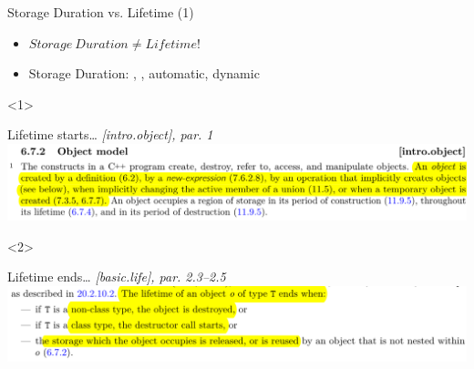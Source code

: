 \begin{frame}{Storage Duration vs. Lifetime (1)}
  \begin{itemize}
    \itemsep=1em
  \item $Storage~Duration \neq Lifetime$!

  \item Storage Duration: , , automatic, dynamic
  \end{itemize}

  \vfill
  \begin{onlyenv}<1>
    \begin{block}{Lifetime starts\ldots%
        \hspace{24ex}\textit{[intro.object], par. 1}}
      \includegraphics[width=\textwidth]{img/cplusplus_draft/intro.object.1.png}
    \end{block}
  \end{onlyenv}

  \begin{onlyenv}<2>
    \begin{block}{Lifetime ends\ldots%
        \hspace{24ex}\textit{[basic.life], par. 2.3--2.5}}
      \includegraphics[width=\textwidth]{img/cplusplus_draft/basic.life.2.png}
    \end{block}
  \end{onlyenv}
\end{frame}

